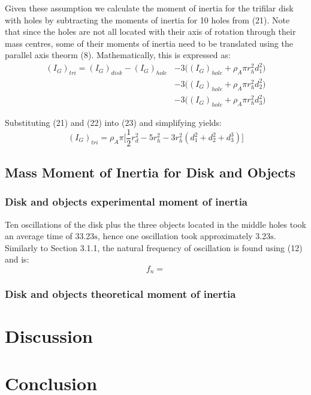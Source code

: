 \documentclass[a4paper]{article}
\begin{document}
Given these assumption we calculate the moment of inertia for the trifilar disk with holes by subtracting the moments of inertia for 10 holes from (21). Note that since the holes are not all located with their axis of rotation through their mass centres, some of their moments of inertia need to be translated using the parallel axis theorm (8). Mathematically, this is expressed as: 
\begin{align}
(I_G)_{tri} = (I_G)_{disk} - (I_G)_{hole} \nonumber &- 3\big((I_G)_{hole} + \rho_A \pi r_h^2 d_1^2\big) \nonumber \\
						   &- 3\big((I_G)_{hole} + \rho_A \pi r_h^2 d_2^2\big) \nonumber \\
						   &- 3\big((I_G)_{hole} + \rho_A \pi r_h^2 d_3^2\big)
\end{align}

Substituting (21) and (22) into (23) and simplifying yields:
\begin{equation}
(I_G)_{tri} = \rho_A \pi \bigg[ \frac{1}{2} r_d^2 - 5r_h^2 - 3r_h^2 (d_1^2 + d_2^2 + d_3^3) \bigg]
\end{equation}

\subsection{Mass Moment of Inertia for Disk and Objects}
\subsubsection{Disk and objects experimental moment of inertia}
Ten oscillations of the disk plus the three objects located in the middle holes took an average time of 33.23$\si{\second}$, hence one oscillation took approximately 3.23$\si{\second}$. Similarly to Section 3.1.1, the natural frequency of oscillation is found using (12) and is:
\begin{equation}
f_n = 
\end{equation}

\subsubsection{Disk and objects theoretical moment of inertia}

\section{Discussion}

\section{Conclusion}




\end{document}
